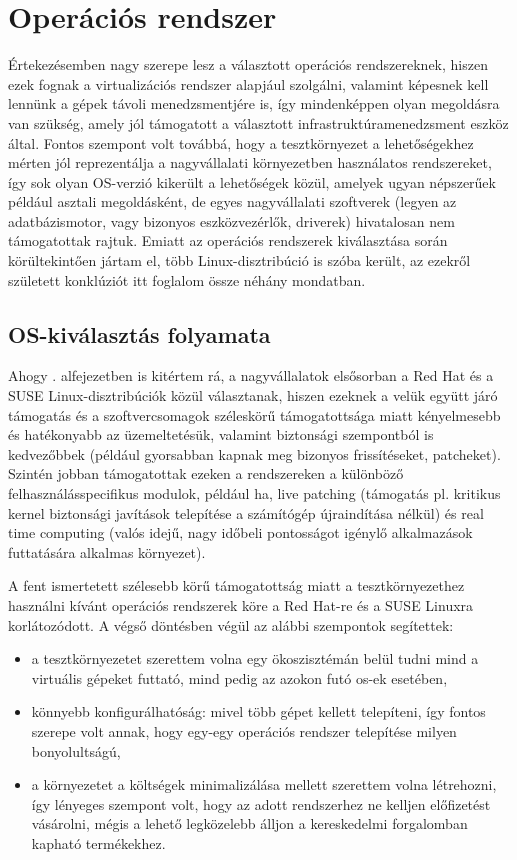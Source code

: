 \section{Operációs rendszer}
Értekezésemben nagy szerepe lesz a választott operációs rendszereknek, hiszen ezek fognak a virtualizációs rendszer alapjául szolgálni, valamint képesnek kell lennünk a gépek távoli menedzsmentjére is, így mindenképpen olyan megoldásra van szükség, amely jól támogatott a választott infrastruktúramenedzsment eszköz által. Fontos szempont volt továbbá, hogy a tesztkörnyezet a lehetőségekhez mérten jól reprezentálja a nagyvállalati környezetben használatos rendszereket, így sok olyan OS-verzió kikerült a lehetőségek közül, amelyek ugyan népszerűek például asztali megoldásként, de egyes nagyvállalati szoftverek (legyen az adatbázismotor, vagy bizonyos eszközvezérlők, driverek) hivatalosan nem támogatottak rajtuk. Emiatt az operációs rendszerek kiválasztása során körültekintően jártam el, több Linux-disztribúció is szóba került, az ezekről született konklúziót itt foglalom össze néhány mondatban.

\subsection{OS-kiválasztás folyamata}
Ahogy . alfejezetben is kitértem rá, a nagyvállalatok elsősorban a Red Hat és a SUSE Linux-disztribúciók közül választanak, hiszen ezeknek a velük együtt járó támogatás és a szoftvercsomagok széleskörű támogatottsága miatt kényelmesebb és hatékonyabb az üzemeltetésük, valamint biztonsági szempontból is kedvezőbbek (például gyorsabban kapnak meg bizonyos frissítéseket, patcheket). Szintén jobban támogatottak ezeken a rendszereken a különböző felhasználásspecifikus modulok, például \acrfull{ha}, live patching (támogatás pl. kritikus kernel biztonsági javítások telepítése a számítógép újraindítása nélkül) és real time computing (valós idejű, nagy időbeli pontosságot igénylő alkalmazások futtatására alkalmas környezet).

A fent ismertetett szélesebb körű támogatottság miatt a tesztkörnyezethez használni kívánt operációs rendszerek köre a Red Hat-re és a SUSE Linuxra korlátozódott. A végső döntésben végül az alábbi szempontok segítettek:
\begin{itemize}
	\item a tesztkörnyezetet szerettem volna egy ökoszisztémán belül tudni mind a virtuális gépeket futtató, mind pedig az azokon futó \acrshort{os}-ek esetében,
	\item könnyebb konfigurálhatóság: mivel több gépet kellett telepíteni, így fontos szerepe volt annak, hogy egy-egy operációs rendszer telepítése milyen bonyolultságú,
	\item a környezetet a költségek minimalizálása mellett szerettem volna létrehozni, így lényeges szempont volt, hogy az adott rendszerhez ne kelljen előfizetést vásárolni, mégis a lehető legközelebb álljon a kereskedelmi forgalomban kapható termékekhez.
\end{itemize}

